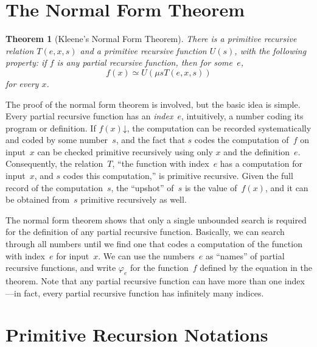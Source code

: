 \documentclass[10pt,a4paper]{article}
\theoremstyle{plain}
\newtheorem{thm}{Theorem}[section]
\theoremstyle{definition}
\theoremstyle{remark}
\newenvironment{explain}{}{}
\newcommand*{\olfileid}[3]{}
\newcommand*{\olsection}[1]{\section*{#1}}
\newcommand*{\ollabel}[1]{\label{#1}}
\providecommand{\cfind}[1]{\varphi_{#1}}
\providecommand{\fdefined}{\mathord{\downarrow}}
\providecommand{\umin}{\mu}
\begin{document}



\olfileid{cmp}{rec}{nft}
\olsection{The Normal Form Theorem}

\begin{thm}[Kleene's Normal Form Theorem]
\ollabel{thm:kleene-nf}
There is a primitive recursive relation $T(e, x, s)$ and a primitive
recursive function $U(s)$, with the following property: if $f$ is any
partial recursive function, then for some~$e$,
\[
f(x) \simeq U(\umin{s}{T(e, x, s)})
\]
for every $x$.
\end{thm}

\begin{explain}
The proof of the normal form theorem is involved, but the basic idea
is simple.  Every partial recursive function has an \emph{index}~$e$,
intuitively, a number coding its program or definition.  If $f(x)
\fdefined$, the computation can be recorded systematically and coded
by some number~$s$, and the fact that $s$ codes the computation of~$f$
on input~$x$ can be checked primitive recursively using only $x$ and
the definition~$e$.  Consequently, the relation~$T$, ``the function
with index~$e$ has a computation for input~$x$, and $s$ codes this
computation,'' is primitive recursive. Given the full record of the
computation~$s$, the ``upshot'' of~$s$ is the value of~$f(x)$, and it
can be obtained from~$s$ primitive recursively as well.

The normal form theorem shows that only a single unbounded search is
required for the definition of any partial recursive function.
Basically, we can search through all numbers until we find one that
codes a computation of the function with index~$e$ for input~$x$. We
can use the numbers~$e$ as ``names'' of partial recursive functions,
and write $\cfind{e}$ for the function~$f$ defined by the equation in
the theorem.  Note that any partial recursive function can have more
than one index---in fact, every partial recursive function has
infinitely many indices.
\end{explain}





\olfileid{cmp}{rec}{not}
\olsection{Primitive Recursion Notations}
\end{document}
